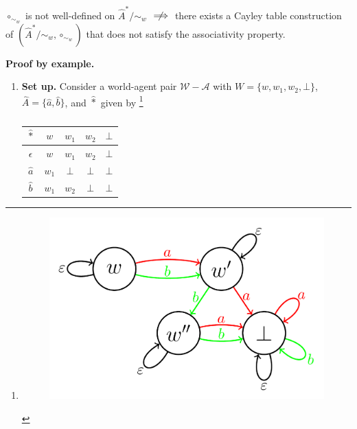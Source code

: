\begin{propositionE}\label{prp:circ_sim_w_not_well_defined_does_not_mean_no_associativity}
    $\circ_{\sim_{w}}$ is not well-defined on $\hat{A}^{*}/\sim_{w}$ $\centernot\implies$ there exists a Cayley table construction of $(\hat{A}^{*}/\sim_{w}, \circ_{\sim_{w}})$ that does not satisfy the associativity property.
\end{propositionE}
\begin{proofE}
\textbf{Proof by example.}
\begin{enumerate}
    \item \textbf{Set up.}
    Consider a world-agent pair $\mathscr{W}-\mathscr{A}$ with $W = \{ w, w_{1}, w_{2}, \bot \}$, $\hat{A} = \{\hat{a}, \hat{b}\}$, and $\hat{\ast}$ given by
    \footnote{\begin{figure}[H]
        \includegraphics[width=0.5\linewidth]{6BeyondSBDRLLocalAlgebras/Images/circ_sim_w_not_well_defined_does_not_mean_no_associativity_counter_example.png}
        \caption{
        }
    \end{figure}}
    \begin{table}[H]
        \centering
        \begin{tabular}{c|cccc}
            $\hat{\ast}$   & $w$       & $w_{1}$   & $w_{2}$   & $\bot$ \\
            \hline
            $\epsilon$      & $w$       & $w_{1}$   & $w_{2}$   & $\bot$ \\
            $\hat{a}$       & $w_{1}$   & $\bot$   & $\bot$   & $\bot$ \\
            $\hat{b}$       & $w_{1}$   & $w_{2}$   & $\bot$   & $\bot$
        \end{tabular}
        \caption{
        }
    \end{table}


\end{enumerate}
\end{proofE}
